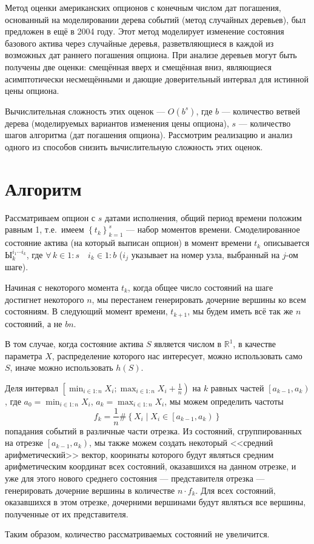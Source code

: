 \documentclass[specialist,
               substylefile = spbu.rtx,
               subf,href,colorlinks=true, 12pt]{disser}
\newcommand{\R}{\ensuremath{\mathbb{R}}}
\begin{document}
\intro
	\par Метод оценки американских опционов с конечным числом дат погашения, основанный на моделировании дерева событий (метод случайных деревьев), был предложен в \citep{Glasserman2004} ещё в 2004 году. Этот метод моделирует изменение состояния базового актива через случайные деревья, разветвляющиеся в каждой из возможных дат раннего погашения опциона. При анализе деревьев могут быть получены две оценки: смещённая вверх и смещённая вниз, являющиеся асимптотически несмещёнными и дающие доверительный интервал для истинной цены опциона.
	\par Вычислительная сложность этих оценок --- $O\left( b^s \right)$, где $b$ --- количество ветвей дерева (моделируемых вариантов изменения цены опциона), $s$ --- количество шагов алгоритма (дат погашения опциона). Рассмотрим реализацию и анализ одного из способов снизить вычислительную сложность этих оценок.

\chapter{Алгоритм}
	\par Рассматриваем опцион с $s$ датами исполнения, общий период времени положим равным 1, т.е.\ имеем $\left\lbrace t_k \right\rbrace _{k=1}^s$ --- набор моментов времени. Смоделированное состояние актива (на который выписан опцион) в момент времени $t_k$ описывается $Ы_k^{i_1 \cdots i_k}$, где $\forall\, k \in 1:s\quad i_k \in 1:b$ ($i_j$ указывает на номер узла, выбранный на $j$-ом шаге).
	
	\par Начиная с некоторого момента $t_k$, когда общее число состояний на шаге достигнет некоторого $n$, мы перестанем генерировать дочерние вершины ко всем состояниям. В следующий момент времени, $t_{k+1}$, мы будем иметь всё так же $n$ состояний, а не $bn$. 
	\par В том случае, когда состояние актива $S$ является числом в $\R ^1$, в качестве параметра $X$, распределение которого нас интересует, можно использовать  само $S$, иначе можно использовать $h(S)$. 
	\par Деля интервал $\left[\min_{i\in 1:n} X_i ; \max_{i\in 1:n} X_i + \frac{1}{n}\right)$ на $k$ равных частей $\left[a_{k-1},a_k\right)$, где $a_0 = \min_{i\in 1:n} X_i$, $a_k = \max_{i\in 1:n} X_i$, мы можем определить частоты \[f_k = \frac{1}{n}\#\left\lbrace X_i \middle\vert X_i\in\left[a_{k-1},a_k\right)\right\rbrace\] попадания событий в различные части отрезка. Из состояний, сгруппированных на отрезке $\left[a_{k-1},a_k\right)$, мы также можем создать некоторый <<средний арифметический>> вектор, кооринаты которого будут являться средним арифметическим координат всех состояний, оказавшихся на данном отрезке, и уже для этого нового среднего состояния --- представителя отрезка --- генерировать дочерние вершины в количестве $n\cdot f_k$. Для всех состояний, оказавшихся в этом отрезке, дочерними вершинами будут являться все вершины, полученные от их представителя. 
	\par Таким образом, количество рассматриваемых состояний не увеличится.
\end{document}
